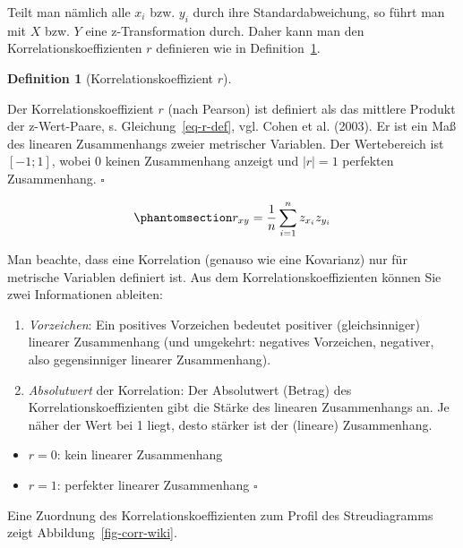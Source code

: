 \documentclass[
  letterpaper,
  twoside,
  open=any]{scrbook}
\providecommand{\tightlist}{%
  \setlength{\itemsep}{0pt}\setlength{\parskip}{0pt}}\usepackage{longtable,booktabs,array}
\theoremstyle{definition}
\newtheorem{definition}{Definition}[chapter]
\theoremstyle{definition}
\theoremstyle{definition}
\theoremstyle{remark}
\begin{document}
Teilt man nämlich alle \(x_i\) bzw. \(y_i\) durch ihre
Standardabweichung, so führt man mit \(X\) bzw. \(Y\) eine
z-Transformation durch. Daher kann man den Korrelationskoeffizienten
\(r\) definieren wie in Definition~\ref{def-r}.

\begin{definition}[Korrelationskoeffizient
\(r\)]\protect\hypertarget{def-r}{}\label{def-r}

Der Korrelationskoeffizient \(r\) (nach Pearson) ist definiert als das
mittlere Produkt der z-Wert-Paare, s. Gleichung~\ref{eq-r-def}, vgl.
Cohen et al. (2003). Er ist ein Maß des linearen Zusammenhangs zweier
metrischer Variablen. Der Wertebereich ist \([-1;1]\), wobei 0 keinen
Zusammenhang anzeigt und \(|r|=1\) perfekten Zusammenhang. \(\square\)

\end{definition}

\begin{equation}\phantomsection\label{eq-r-def}{r_{xy}=\frac{1}{n}\sum_{i=1}^n z_{x_i} z_{y_i}}\end{equation}

Man beachte, dass eine Korrelation (genauso wie eine Kovarianz) nur für
metrische Variablen definiert ist. Aus dem Korrelationskoeffizienten
können Sie zwei Informationen ableiten:

\begin{enumerate}
\def\labelenumi{\arabic{enumi}.}
\tightlist
\item
  \emph{Vorzeichen}: Ein positives Vorzeichen bedeutet positiver
  (gleichsinniger) linearer Zusammenhang (und umgekehrt: negatives
  Vorzeichen, negativer, also gegensinniger linearer Zusammenhang).
\item
  \emph{Absolutwert} der Korrelation: Der Absolutwert (Betrag) des
  Korrelationskoeffizienten gibt die Stärke des linearen Zusammenhangs
  an. Je näher der Wert bei 1 liegt, desto stärker ist der (lineare)
  Zusammenhang.
\end{enumerate}

\begin{itemize}
\tightlist
\item
  \(r = 0\): kein linearer Zusammenhang
\item
  \(r = 1\): perfekter linearer Zusammenhang \(\square\)
\end{itemize}

Eine Zuordnung des Korrelationskoeffizienten zum Profil des
Streudiagramms zeigt Abbildung~\ref{fig-corr-wiki}.
\end{document}
